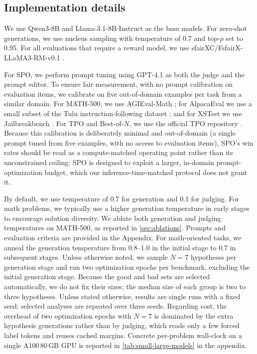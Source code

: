 \documentclass[letterpaper]{article} %
\begin{document}
\subsection{Implementation details}
We use Qwen3-8B and Llama-3.1-8B-Instruct as the base models. For zero-shot generations, we use nucleus sampling with temperature of 0.7 and top-\(p\) set to 0.95.
For all evaluations that require a reward model, we use sfairXC/FsfairX-LLaMA3-RM-v0.1 \citep{dong2024rlhf}.

For SPO, we perform prompt tuning using GPT-4.1 as both the judge and the prompt editor. To ensure fair measurement, with no prompt calibration on evaluation items, we calibrate on five out-of-domain examples per task from a similar domain.
For MATH-500, we use AGIEval-Math \citep{zhongagieval}; for AlpacaEval we use a small subset of the Tulu instruction-following dataset \citep{lambert2024tulu}; and for XSTest we use Jailbreakbench \citep{chao2024jailbreakbench}. For TPO and Best-of-\(N\), we use the official TPO repository \citep{litest}. \textcolor{orange!85!black}{Because this calibration is deliberately minimal and out-of-domain (a single prompt tuned from five examples, with no access to evaluation items), SPO's win rates should be read as a compute-matched operating point rather than its unconstrained ceiling: SPO is designed to exploit a larger, in-domain prompt-optimization budget, which our inference-time-matched protocol does not grant it.}

By default, we use temperature of 0.7 for generation and 0.1 for judging. For math problems, we typically use a higher generation temperature in early stages to encourage solution diversity. We ablate both generation and judging temperatures on MATH-500, as reported in \cref{sec:ablations}. Prompts and evaluation criteria are provided in the Appendix.
For math-oriented tasks, we anneal the generation temperature from 0.8--1.0 in the initial stage to 0.7 in subsequent stages. Unless otherwise noted, we sample \(N=7\) hypotheses per generation stage and run two optimization epochs per benchmark, excluding the initial generation stage. Because the good and bad sets are selected automatically, we do not fix their sizes; the median size of each group is two to three hypotheses. \textcolor{orange!85!black}{Unless stated otherwise, results are single runs with a fixed seed; selected analyses are repeated over three seeds.} \textcolor{green!50!black}{Regarding cost, the overhead of two optimization epochs with \(N=7\) is dominated by the extra hypothesis generations rather than by judging, which reads only a few forced label tokens and reuses cached margins.} \textcolor{orange!85!black}{Concrete per-problem wall-clock on a single A100\,80\,GB GPU is reported in \cref{tab:small-large-models} in the appendix.}
\end{document}
